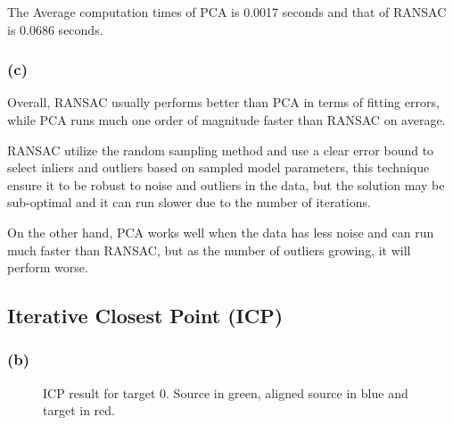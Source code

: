 \documentclass{article}
\theoremstyle{definition} %
\begin{document}
The Average computation times of PCA is 0.0017 seconds and that of RANSAC is 0.0686 seconds.

\subsubsection*{(c)}

Overall, RANSAC usually performs better than PCA in terms of fitting errors, while PCA runs much one order of magnitude faster than RANSAC on average. 

RANSAC utilize the random sampling method and use a clear error bound to select inliers and outliers based on sampled model parameters, this technique ensure it to be robust to noise and outliers in the data, but the solution may be sub-optimal and it can run slower due to the number of iterations.

On the other hand, PCA works well when the data has less noise and can run much faster than RANSAC, but as the number of outliers growing, it will perform worse.


\subsection*{Iterative Closest Point (ICP)}


\subsubsection*{(b)}

\begin{figure}[H]
    \centering
    \quad
    \caption{ICP result for target 0. Source in green, aligned source in blue and target in red.}
    \label{fig:icp_tgt_0}
\end{figure}
\end{document}
